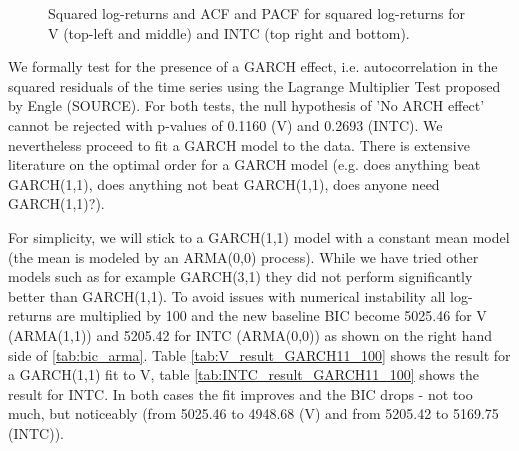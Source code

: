 \begin{figure}[h!]
    \centering
    \begin{adjustbox}{width=.95\textwidth,center}
    
    
    \end{adjustbox}
    \hspace{3ex}
    \begin{adjustbox}{width=.95\textwidth,center}
    
    \end{adjustbox}
    \begin{adjustbox}{width=.95\textwidth,center}
    
    \end{adjustbox}
    \caption{Squared log-returns and ACF and PACF for squared log-returns for V (top-left and middle) and INTC (top right and bottom). }
    \label{fig:V_INTC_squared}
\end{figure}{}

We formally test for the presence of a GARCH effect, i.e. autocorrelation in the squared residuals of the time series using the Lagrange Multiplier Test proposed by Engle (SOURCE). For both tests, the null hypothesis of 'No ARCH effect' cannot be rejected with p-values of 0.1160 (V) and 0.2693 (INTC). We nevertheless proceed to fit a GARCH model to the data. There is extensive literature on the optimal order for a GARCH model (e.g. does anything beat GARCH(1,1), does anything not beat GARCH(1,1), does anyone need GARCH(1,1)?). 

For simplicity, we will stick to a GARCH(1,1) model with a constant mean model (the mean is modeled by an ARMA(0,0) process). While we have tried other models such as for example GARCH(3,1) they did not perform significantly better than GARCH(1,1). To avoid issues with numerical instability all log-returns are multiplied by 100 and the new baseline BIC become 5025.46 for V (ARMA(1,1)) and 5205.42 for INTC (ARMA(0,0)) as shown on the right hand side of \ref{tab:bic_arma}. Table \ref{tab:V_result_GARCH11_100} shows the result for a GARCH(1,1) fit to V, table \ref{tab:INTC_result_GARCH11_100} shows the result for INTC. In both cases the fit improves and the BIC drops - not too much, but noticeably (from 5025.46 to 4948.68 (V) and from 5205.42 to 5169.75 (INTC)). 

\begin{table}[h]
    \centering
    
    \caption{}
    \label{tab:V_result_GARCH11_100}
\end{table}{}

